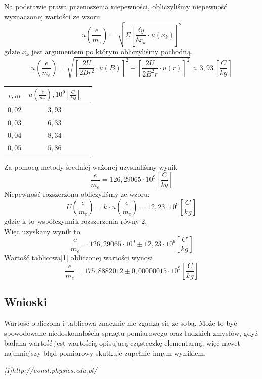 \documentclass{article}
\begin{document}
Na podstawie prawa przenoszenia niepewności, obliczyliśmy niepewność wyznaczonej wartości ze wzoru 
$$u(\frac{e}{m_e}) = \sqrt{\Sigma[\frac{\delta y}{\delta x_k} \cdot u(x_k)]^2}$$
gdzie $x_k$ jest argumentem po którym obliczyliśmy pochodną.\\
$$u(\frac{e}{m_e}) = \sqrt{[\frac{2U}{2Br^2} \cdot u(B)]^2 + [\frac{2U}{2B^2r} \cdot u(r)]^2} \approx 3,93 \ [\frac{C}{kg}]$$ 


\begin{center}
\begin{tabular}{|c|c|c|}
\hline
$r, m$ & $u(\frac{e}{m_e}), 10^9 [\frac{C}{kg}]$  \\ \hline 
$0,02$ & $3,93$  \\ \hline 
$0,03$ & $6,33$  \\ \hline 
$0,04$ & $8,34$  \\ \hline 
$0,05$ & $5,86$  \\ \hline 
\end{tabular}
\end{center}
Za pomocą metody średniej ważonej uzyskaliśmy wynik
$$\frac{e}{m_e} = 126,29065 \cdot 10^9 [\frac{C}{kg}]$$
Niepewność rozszerzoną obliczyliśmy ze wzoru:
$$U(\frac{e}{m_e} )=k\cdot u(\frac{e}{m_e} ) = 12,23 \cdot 10^9 [\frac{C}{kg}]$$
gdzie k to współczynnik rozszerzenia równy $2$.\\
Więc uzyskany wynik to 
$$\frac{e}{m_e} = 126,29065 \cdot 10^9 \pm 12,23 \cdot 10^9 [\frac{C}{kg}]$$
Wartość tablicowa[1] obliczonej wartości wynosi
$$\frac{e}{m_e} = 175,8882012 \pm 0,00000015 \cdot 10^9 [\frac{C}{kg}]$$
\subsection{Wnioski}
Wartość obliczona i tablicowa znacznie nie zgadza się ze sobą. Może to być spowodowane niedoskonałością sprzętu pomiarowego oraz ludzkich zmysłów, gdyż badana wartość jest wartością opisującą cząsteczkę elementarną, więc nawet najmniejszy błąd pomiarowy skutkuje zupełnie innym wynikiem.
\begin{flushright}
\begin{scriptsize}
\textit{[1]http://const.physics.edu.pl/} \\
\end{scriptsize}
\end{flushright}
\end{document}
